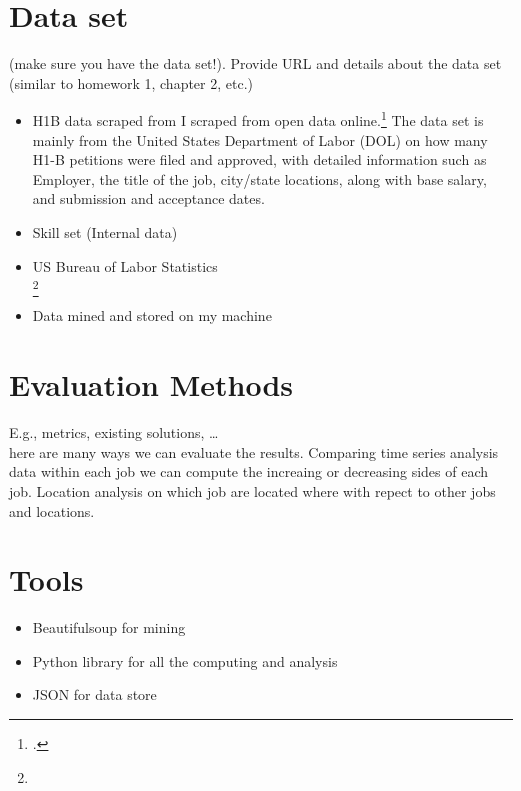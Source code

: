 \section{Data set }
(make sure you have the data set!). Provide URL and details about the data set (similar to homework 1, chapter 2, etc.)
	\begin{itemize}
	\item 
	
	H1B data  scraped from  I scraped from open data online.\footnote{.}
	The data set is mainly from the United States Department of Labor (DOL) on how many H1-B petitions were filed and approved, with detailed information such as Employer, the title of the job, city/state locations, along with base salary, and submission and acceptance dates. 
	\item Skill set (Internal data)
	\item US Bureau of Labor Statistics \\
	\footnote{
}
	\item Data mined and stored on my machine
\end{itemize}
\section{ Evaluation Methods }
E.g., metrics, existing solutions, …\\
here are many ways we can evaluate the results. Comparing  time series analysis data within each job we can compute the increaing or decreasing sides of each job. Location analysis on which job are located where with repect to other jobs and locations. 

\section{Tools}
\begin{itemize}
	\item Beautifulsoup for mining
	\item Python library for all the computing and analysis
	\item JSON for data store
\end{itemize}
